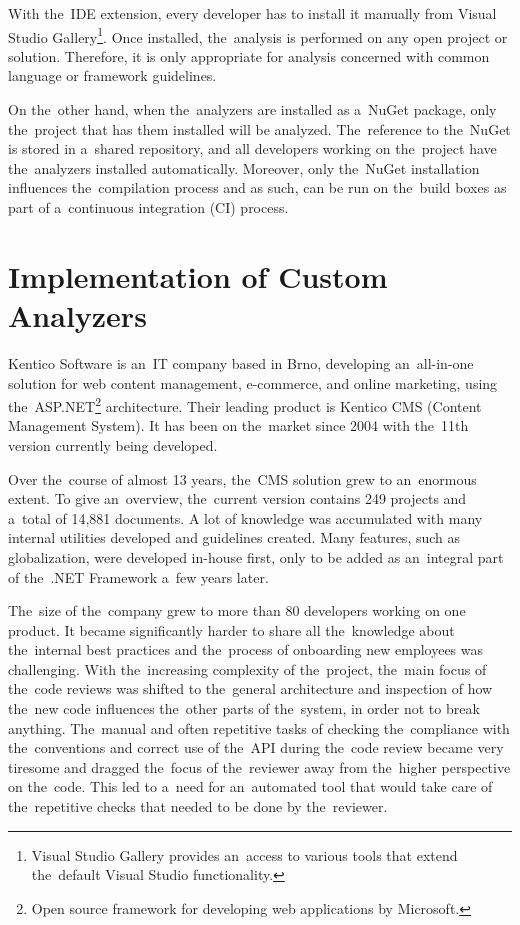 \documentclass[
  digital, %
  table,   %
  lof,     %
  lot,     %
  oneside,
]{fithesis3}
\begin{document}
With the~IDE extension, every developer has to install it manually from Visual Studio Gallery\footnote{Visual Studio Gallery provides an~access to various tools that extend the~default Visual Studio functionality.}. Once installed, the~analysis is performed on any open project or solution. Therefore, it is only appropriate for analysis concerned with common language or framework guidelines.

On the~other hand, when the~analyzers are installed as a~NuGet package, only the~project that has them installed will be analyzed. The~reference to the~NuGet is stored in a~shared repository, and all developers working on the~project have the~analyzers installed automatically. Moreover, only the~NuGet installation influences the~compilation process and as such, can be run on the~build boxes as part of a~continuous integration (CI) process.

\chapter{Implementation of Custom Analyzers}
\label{chap:custom-roslyn-analyzers}
Kentico Software is an~IT company based in Brno, developing an~all-in-one solution for web content management, e-commerce, and online marketing, using the~ASP.NET\footnote{Open source framework for developing web applications by Microsoft.} architecture. Their leading product is Kentico CMS (Content Management System). It has been on the~market since 2004 with the~11th version currently being developed. 

Over the~course of almost 13 years, the~CMS solution grew to an~enormous extent. To give an~overview, the~current version contains 249 projects and a~total of 14,881 documents. A lot of knowledge was accumulated with many internal utilities developed and guidelines created. Many features, such as globalization, were developed in-house first, only to be added as an~integral part of the~.NET Framework a~few years later.

The~size of the~company grew to more than 80 developers working on one product. It became significantly harder to share all the~knowledge about the~internal best practices and the~process of onboarding new employees was challenging. With the~increasing complexity of the~project, the~main focus of the~code reviews was shifted to the~general architecture and inspection of how the~new code influences the~other parts of the~system, in order not to break anything. The~manual and often repetitive tasks of checking the~compliance with the~conventions and correct use of the~API during the~code review became very tiresome and dragged the~focus of the~reviewer away from the~higher perspective on the~code. This led to a~need for an~automated tool that would take care of the~repetitive checks that needed to be done by the~reviewer.
\end{document}
